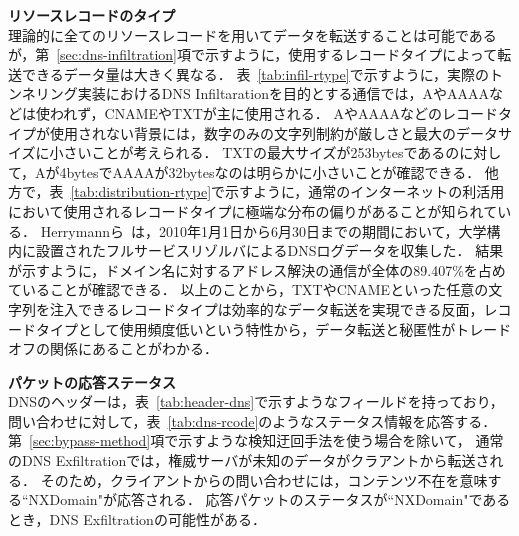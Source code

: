\hspace{-12pt}\textbf{リソースレコードのタイプ}\\
\hspace{12pt}理論的に全てのリソースレコードを用いてデータを転送することは可能であるが，第~\ref{sec:dns-infiltration}項で示すように，使用するレコードタイプによって転送できるデータ量は大きく異なる．
表~\ref{tab:infil-rtype}で示すように，実際のトンネリング実装におけるDNS Infiltarationを目的とする通信では，AやAAAAなどは使われず，CNAMEやTXTが主に使用される．
AやAAAAなどのレコードタイプが使用されない背景には，数字のみの文字列制約が厳しさと最大のデータサイズに小さいことが考えられる．
TXTの最大サイズが253bytesであるのに対して，Aが4bytesでAAAAが32bytesなのは明らかに小さいことが確認できる．
他方で，表~\ref{tab:distribution-rtype}で示すように，通常のインターネットの利活用において使用されるレコードタイプに極端な分布の偏りがあることが知られている．
Herrymannら~\cite{Herrymann}は，2010年1月1日から6月30日までの期間において，大学構内に設置されたフルサービスリゾルバによるDNSログデータを収集した．
結果が示すように，ドメイン名に対するアドレス解決の通信が全体の89.407\%を占めていることが確認できる．
以上のことから，TXTやCNAMEといった任意の文字列を注入できるレコードタイプは効率的なデータ転送を実現できる反面，レコードタイプとして使用頻度低いという特性から，データ転送と秘匿性がトレードオフの関係にあることがわかる．



%
%
\newpage
\hspace{-12pt}\textbf{パケットの応答ステータス}\\
\hspace{12pt}DNSのヘッダーは，表~\ref{tab:header-dns}で示すようなフィールドを持っており，問い合わせに対して，表~\ref{tab:dns-rcode}のようなステータス情報を応答する．
第~\ref{sec:bypass-method}項で示すような検知迂回手法を使う場合を除いて，
通常のDNS Exfiltrationでは，権威サーバが未知のデータがクラアントから転送される．
そのため，クライアントからの問い合わせには，コンテンツ不在を意味する``NXDomain"が応答される．
応答パケットのステータスが``NXDomain"であるとき，DNS Exfiltrationの可能性がある．



